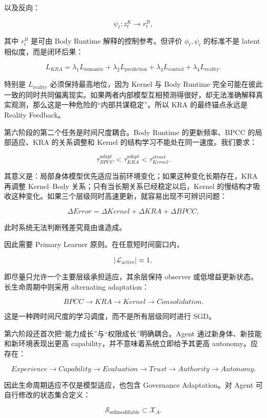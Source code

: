 以及反向：

\[
\psi_t:
z_t^K
\rightarrow
r_t^B,
\]

其中 \(r_t^B\) 是可由 Body Runtime 解释的控制参考。但评价 \(\phi_t,\psi_t\) 的标准不是 latent 相似度，而是闭环后果：

\[
L_{KRA}
=
\lambda_1 L_{\mathrm{semantic}}
+
\lambda_2 L_{\mathrm{prediction}}
+
\lambda_3 L_{\mathrm{control}}
+
\lambda_4 L_{\mathrm{reality}}.
\]

特别是 \(L_{\mathrm{reality}}\) 必须保持最高地位，因为 Kernel 与 Body Runtime 完全可能在彼此一致的同时共同偏离现实。如果两者内部模型互相预测得很好，却无法准确解释真实观测，那么这是一种危险的“内部共谋稳定”。所以 KRA 的最终锚点永远是 Reality Feedback。

第六阶段的第二个任务是时间尺度耦合。Body Runtime 的更新频率、BPCC 的局部适应、KRA 的关系调整和 Kernel 的结构学习不能处在同一速度。我们要求：

\[
\tau_{BPCC}^{adapt}
<
\tau_{KRA}^{adapt}
<
\tau_{Kernel}^{struct}.
\]

其意义是：局部身体模型优先适应当前环境变化；如果这种变化长期存在，KRA 再调整 Kernel--Body 关系；只有当长期关系已经稳定以后，Kernel 的慢结构才吸收这种变化。如果三个层级同时高速更新，就容易出现不可辨识问题：

\[
\Delta Error
=
\Delta Kernel
+
\Delta KRA
+
\Delta BPCC,
\]

此时系统无法判断残差究竟由谁造成。

因此需要 Primary Learner 原则。在任意短时间窗口内，

\[
|\mathcal L_{\mathrm{active}}|
\approx 1,
\]

即尽量只允许一个主要层级承担适应，其余层保持 observer 或低增益更新状态。长生命周期中则采用 alternating adaptation：

\[
BPCC
\rightarrow
KRA
\rightarrow
Kernel
\rightarrow
Consolidation.
\]

这是一种跨时间尺度的学习调度，而不是所有层级同时进行 SGD。

第六阶段还首次把“能力成长”与“权限成长”明确耦合。Agent 通过新身体、新技能和新环境表现出更高 capability，并不意味着系统立即给予其更高 autonomy。应存在：

\[
Experience
\rightarrow
Capability
\rightarrow
Evaluation
\rightarrow
Trust
\rightarrow
Authority
\rightarrow
Autonomy.
\]

因此生命周期适应不仅是模型适应，也包含 Governance Adaptation。对 Agent 可自行修改的状态集合定义：

\[
\mathcal S_{\mathrm{selfmodifiable}}
\subset
\mathcal X_A.
\]

